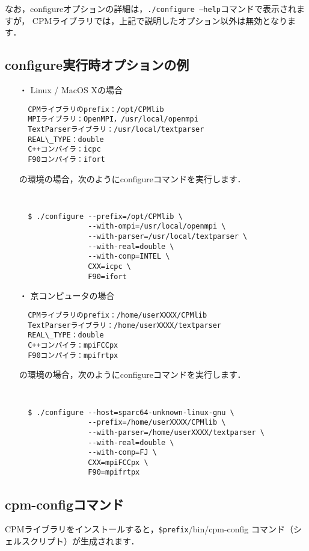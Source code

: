 なお，configureオプションの詳細は，{\tt ./configure --help}コマンドで表示されますが，
CPMライブラリでは，上記で説明したオプション以外は無効となります．
\clearpage

\subsection{configure実行時オプションの例}

\begin{itemize}
\item[・] {Linux / MacOS Xの場合}
\begin{verbatim}
  CPMライブラリのprefix：/opt/CPMlib
  MPIライブラリ：OpenMPI，/usr/local/openmpi
  TextParserライブラリ：/usr/local/textparser
  REAL\_TYPE：double
  C++コンパイラ：icpc
  F90コンパイラ：ifort
\end{verbatim}
の環境の場合，次のようにconfigureコマンドを実行します．
{\tt
\begin{verbatim}
  $ ./configure --prefix=/opt/CPMlib \
                --with-ompi=/usr/local/openmpi \
                --with-parser=/usr/local/textparser \
                --with-real=double \
                --with-comp=INTEL \
                CXX=icpc \
                F90=ifort
\end{verbatim}
}

\item[・] {京コンピュータの場合}
\begin{verbatim}
  CPMライブラリのprefix：/home/userXXXX/CPMlib
  TextParserライブラリ：/home/userXXXX/textparser
  REAL\_TYPE：double
  C++コンパイラ：mpiFCCpx
  F90コンパイラ：mpifrtpx
\end{verbatim}
の環境の場合，次のようにconfigureコマンドを実行します．
{\tt
\begin{verbatim}
  $ ./configure --host=sparc64-unknown-linux-gnu \
                --prefix=/home/userXXXX/CPMlib \
                --with-parser=/home/userXXXX/textparser \
                --with-real=double \
                --with-comp=FJ \
                CXX=mpiFCCpx \
                F90=mpifrtpx
\end{verbatim}
}
\end{itemize}


\clearpage


\subsection{cpm-configコマンド}
\label{cpmconfig}
CPMライブラリをインストールすると，{\tt \$prefix}/bin/cpm-config
コマンド（シェルスクリプト）が生成されます．

